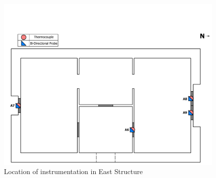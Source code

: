 \documentclass[12pt,oneside]{book}
\begin{document}
\begin{figure}[!ht]
\includegraphics[trim=0cm 0cm 0.25cm 3.75cm, clip=true, width=6in]{../Drawings/Instrumentation/East_Structure_Devices_Hose_Test}
\caption[Location of Instrumentation in East Structure]{Location of instrumentation in East Structure}
\label{fig:east_devices}
\end{figure}
\end{document}
